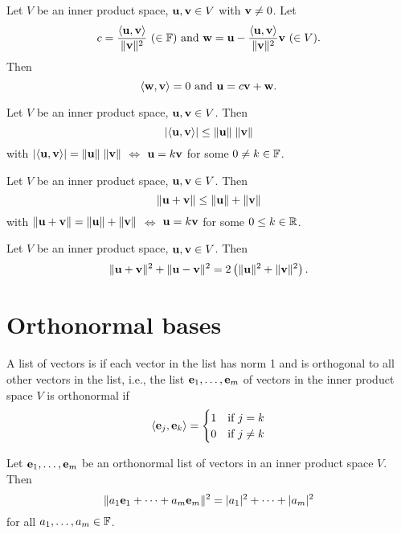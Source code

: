 \documentclass[aspectratio=169]{beamer}
\begin{document}
\begin{frame}
\begin{theorem}
Let $V$ be an inner product space, $\mathbf{u},\mathbf{v}\in V$ with $\mathbf{v}\neq 0$. Let 
\[
c=\frac{\langle\mathbf{u},\mathbf{v}\rangle}{\|\mathbf{v}\|^2}
\ (\in\mathbb{F})
\textrm{ and }
\mathbf{w}=\mathbf{u}-\frac{\langle\mathbf{u},\mathbf{v}\rangle}{\|\mathbf{v}\|^2}\mathbf{v}
\ (\in V).
\]
Then
\[
\langle\mathbf{w},\mathbf{v}\rangle =0 \textrm{ and }\mathbf{u}=c\mathbf{v}+\mathbf{w}.
\]
\end{theorem}
\begin{importanttheorem}
Let $V$ be an inner product space, $\mathbf{u},\mathbf{v}\in V$. 
Then
\[
|\langle\mathbf{u},\mathbf{v}\rangle|\leq \|\mathbf{u}\|\;\|\mathbf{v}\|
\]
with $|\langle\mathbf{u},\mathbf{v}\rangle|= \|\mathbf{u}\|\;\|\mathbf{v}\|$ $\Leftrightarrow$ $\mathbf{u}=k\mathbf{v}$ for some $0\neq k\in\mathbb{F}$.
\end{importanttheorem}
\end{frame}

\begin{frame}
\begin{importanttheorem}
Let $V$ be an inner product space, $\mathbf{u},\mathbf{v}\in V$. 
Then
\[
\|\mathbf{u}+\mathbf{v}\|\leq \|\mathbf{u}\|+\|\mathbf{v}\|
\]
with $\|\mathbf{u}+\mathbf{v}\|= \|\mathbf{u}\|+\|\mathbf{v}\|$ $\Leftrightarrow$ $\mathbf{u}=k\mathbf{v}$ for some $0\leq k\in\mathbb{R}$.
\end{importanttheorem}
\vfill
\begin{theorem}
Let $V$ be an inner product space, $\mathbf{u},\mathbf{v}\in V$. 
Then
\[
\|\mathbf{u}+\mathbf{v}\|^2+\|\mathbf{u}-\mathbf{v}\|^2
=2\left(\|\mathbf{u}\|^2+\|\mathbf{v}\|^2\right).
\]
\end{theorem}
\end{frame}


\section{Orthonormal bases}

\begin{frame}
\begin{definition}
A list of vectors is  if each vector in the list has norm 1 and is orthogonal to all other vectors in the list, i.e., the list $\mathbf{e}_1,\ldots,\mathbf{e}_m$ of vectors in the inner product space $V$ is orthonormal if
\[
\langle \mathbf{e}_j,\mathbf{e}_k\rangle =
\begin{cases}
1 & \textrm{if }j=k \\
0 & \textrm{if }j\neq k
\end{cases}
\]
\end{definition}
\vfill
\begin{importanttheorem}
Let $\mathbf{e}_1,\ldots,\mathbf{e}_m$ be an orthonormal list of vectors in an inner product space $V$. Then
\[
\|a_1\mathbf{e}_1+\cdots+a_m\mathbf{e}_m\|^2=|a_1|^2+\cdots+|a_m|^2
\]
for all $a_1,\ldots,a_m\in\mathbb{F}$.
\end{importanttheorem}
\end{frame}
\end{document}
